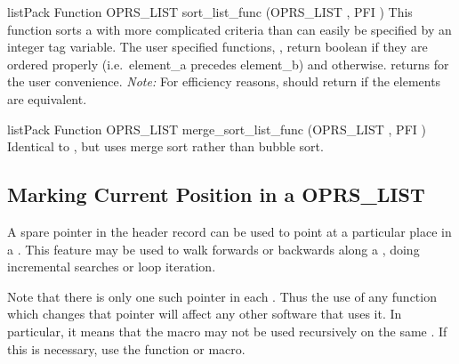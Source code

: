 \begin{typefn}{listPack Function} {OPRS\_LIST} {sort\_list\_func} {(OPRS\_LIST ,
PFI )} This function sorts a  with more complicated
criteria than can easily be specified by an integer tag variable. The user
specified functions,
, return boolean
 if they are ordered properly (i.e.\ element\_a precedes
element\_b) and  otherwise.
 returns 
for the user convenience.
\emph{Note:} For efficiency reasons,  should return
 if
the elements are equivalent.
\end{typefn}

\begin{typefn}{listPack Function} {OPRS\_LIST} {merge\_sort\_list\_func} {(OPRS\_LIST
, PFI )}
Identical to , but uses merge sort rather than bubble
sort.
\end{typefn}

\subsection{Marking Current Position in a OPRS\_LIST}

A spare pointer in the  header record can be used
to point at a particular place in a .  This feature may be used
to walk forwards or backwards along a , doing incremental
searches or loop iteration.

Note that there is only one such pointer in each .  Thus the use of
any function which changes that pointer will affect any other software that
uses it.  In particular, it means that the
 macro may not be used recursively on the
same .  If this is necessary, use the  function
or  macro.


